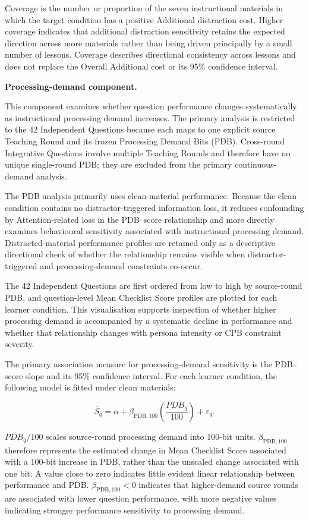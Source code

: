 Coverage is the number or proportion of the seven instructional materials in which the target condition has a positive Additional distraction cost. Higher coverage indicates that additional distraction sensitivity retains the expected direction across more materials rather than being driven principally by a small number of lessons. Coverage describes directional consistency across lessons and does not replace the Overall Additional cost or its 95\% confidence interval.

\textbf{Processing-demand component.}

This component examines whether question performance changes systematically as instructional processing demand increases. The primary analysis is restricted to the 42 Independent Questions because each maps to one explicit source Teaching Round and its frozen Processing Demand Bits (PDB). Cross-round Integrative Questions involve multiple Teaching Rounds and therefore have no unique single-round PDB; they are excluded from the primary continuous-demand analysis.

The PDB analysis primarily uses clean-material performance. Because the clean condition contains no distractor-triggered information loss, it reduces confounding by Attention-related loss in the PDB--score relationship and more directly examines behavioural sensitivity associated with instructional processing demand. Distracted-material performance profiles are retained only as a descriptive directional check of whether the relationship remains visible when distractor-triggered and processing-demand constraints co-occur.

The 42 Independent Questions are first ordered from low to high by source-round PDB, and question-level Mean Checklist Score profiles are plotted for each learner condition. This visualisation supports inspection of whether higher processing demand is accompanied by a systematic decline in performance and whether that relationship changes with persona intensity or CPB constraint severity.

The primary association measure for processing-demand sensitivity is the PDB--score slope and its 95\% confidence interval. For each learner condition, the following model is fitted under clean materials:

\[
\bar S_q
=
\alpha
+
\beta_{\mathrm{PDB},100}
\left(
\frac{PDB_q}{100}
\right)
+
\varepsilon_q.
\]

$PDB_q/100$ scales source-round processing demand into 100-bit units. $\beta_{\mathrm{PDB},100}$ therefore represents the estimated change in Mean Checklist Score associated with a 100-bit increase in PDB, rather than the unscaled change associated with one bit. A value close to zero indicates little evident linear relationship between performance and PDB. $\beta_{\mathrm{PDB},100}<0$ indicates that higher-demand source rounds are associated with lower question performance, with more negative values indicating stronger performance sensitivity to processing demand.

